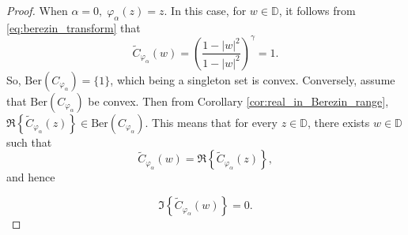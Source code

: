 \documentclass[12pt, reqno]{amsart}
\theoremstyle{definition}
\theoremstyle{remark}
\numberwithin{equation}{section}
\begin{document}
\begin{proof}
    When $\alpha=0,\;\varphi_\alpha(z)=z.$ In this case, for $w\in \mathbb{D}$, it follows from \eqref{eq:berezin_transform} that 
         \begin{equation*}
             \widetilde{C}_{\varphi_\alpha}(w)=\left(\frac{1-|w|^2}{1-|w|^2}\right)^\gamma=1.
         \end{equation*}
         So, $\mbox{Ber}(C_{\varphi_\alpha})=\{1\}$, which being a singleton set is convex. Conversely, assume that $\mbox{Ber}(C_{\varphi_\alpha})$ be convex. Then from Corollary \ref{cor:real_in_Berezin_range}, $\Re\left\{\widetilde{C}_{\varphi_\alpha}(z)\right\} \in \mbox{Ber} (C_{\varphi_\alpha})$. This means that for every $z\in \mathbb{D}$, there exists $w\in \mathbb{D}$ such that
         \begin{equation*}
             \widetilde{C}_{\varphi_\alpha}(w)=\Re\left\{\widetilde{C}_{\varphi_\alpha}(z)\right\},
         \end{equation*}
         and hence 


\begin{equation}\label{eq:imaginary_vanishes}
             \Im\left\{\widetilde{C}_{\varphi_\alpha}(w)\right\}=0.
         \end{equation}



\end{proof}
\end{document}

